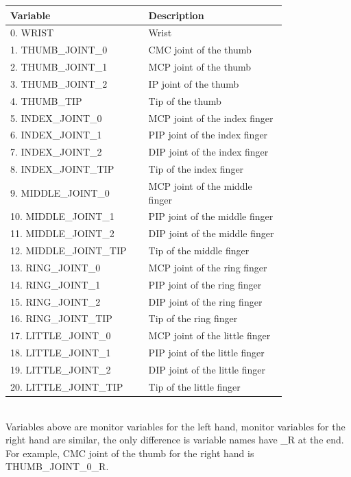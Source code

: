 \documentclass[12pt]{article}
\begin{document}
\renewcommand{\arraystretch}{1.2}
\noindent \begin{tabularx}{\textwidth}{p{0.4\linewidth}|p{0.4\linewidth}}
\toprule
\textbf{Variable} & \textbf{Description}\\
\midrule
0. WRIST 
& Wrist \\
\hline
1. THUMB\_JOINT\_0
&CMC joint of the thumb\\
\hline
2. THUMB\_JOINT\_1
&MCP joint of the thumb\\
\hline
3. THUMB\_JOINT\_2
&IP joint of the thumb\\
\hline
4. THUMB\_TIP
&Tip of the thumb\\
\hline
5. INDEX\_JOINT\_0
&MCP joint of the index finger\\
\hline
6. INDEX\_JOINT\_1
&PIP joint of the index finger\\
\hline
7. INDEX\_JOINT\_2
&DIP joint of the index finger\\
\hline
8. INDEX\_JOINT\_TIP
&Tip of the index finger\\
\hline
9. MIDDLE\_JOINT\_0
&MCP joint of the middle finger\\
\hline
10. MIDDLE\_JOINT\_1
&PIP joint of the middle finger\\
\hline
11. MIDDLE\_JOINT\_2
&DIP joint of the middle finger\\
\hline
12. MIDDLE\_JOINT\_TIP
&Tip of the middle finger\\
\hline
13. RING\_JOINT\_0
&MCP joint of the ring finger\\
\hline
14. RING\_JOINT\_1
&PIP joint of the ring finger\\
\hline
15. RING\_JOINT\_2
&DIP joint of the ring finger\\
\hline
16. RING\_JOINT\_TIP
&Tip of the ring finger\\
\hline
17. LITTLE\_JOINT\_0
&MCP joint of the little finger\\
\hline
18. LITTLE\_JOINT\_1
&PIP joint of the little finger\\
\hline
19. LITTLE\_JOINT\_2
&DIP joint of the little finger\\
\hline
20. LITTLE\_JOINT\_TIP
&Tip of the little finger\\
\bottomrule
\end{tabularx}
~\\
Variables above are monitor variables for the left hand, monitor variables for the right hand are similar, the only difference is variable names have \_R at the end. For example, CMC joint of the thumb for the right hand is THUMB\_JOINT\_0\_R.
\end{document}
